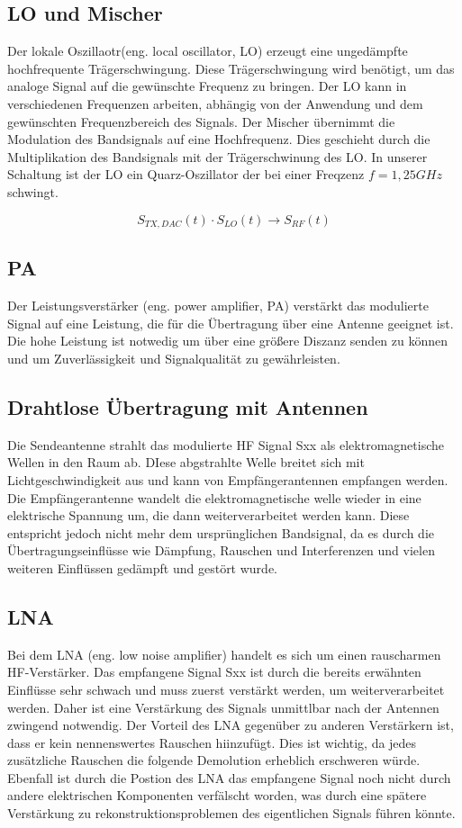 \subsection{LO und Mischer}
Der lokale Oszillaotr(eng. local oscillator, LO) erzeugt eine ungedämpfte hochfrequente Trägerschwingung. Diese Trägerschwingung 
wird benötigt, um das analoge Signal auf die gewünschte Frequenz zu bringen. Der LO kann in verschiedenen Frequenzen arbeiten,
abhängig von der Anwendung und dem gewünschten Frequenzbereich des Signals. Der Mischer übernimmt die Modulation des
Bandsignals auf eine Hochfrequenz. Dies geschieht durch die Multiplikation des Bandsignals mit der Trägerschwinung des LO.
In unserer Schaltung ist der LO ein Quarz-Oszillator der bei einer Freqzenz $f=1,25GHz$ schwingt.

\begin{equation}
    S_{TX,DAC}(t) \cdot S_{LO}(t) \rightarrow S_{RF}(t)
\end{equation}


\subsection{PA}
Der Leistungsverstärker (eng. power amplifier, PA) verstärkt das modulierte Signal auf eine Leistung, die für die Übertragung über eine Antenne 
geeignet ist. Die hohe Leistung ist notwedig um über eine größere Diszanz senden zu können und um Zuverlässigkeit und
Signalqualität zu gewährleisten. 

\subsection{Drahtlose Übertragung mit Antennen}
Die Sendeantenne strahlt das modulierte HF Signal Sxx als elektromagnetische Wellen in den Raum ab. DIese abgstrahlte Welle
breitet sich mit Lichtgeschwindigkeit aus und kann von Empfängerantennen empfangen werden. Die Empfängerantenne wandelt
die elektromagnetische welle wieder in eine elektrische Spannung um, die dann weiterverarbeitet werden kann. Diese entspricht
jedoch nicht mehr dem ursprünglichen Bandsignal, da es durch die Übertragungseinflüsse wie Dämpfung, Rauschen und Interferenzen
und vielen weiteren Einflüssen gedämpft und gestört wurde.

\subsection{LNA}
Bei dem LNA (eng. low noise amplifier) handelt es sich um einen rauscharmen HF-Verstärker. Das empfangene Signal Sxx ist
durch die bereits erwähnten Einflüsse sehr schwach und muss  zuerst verstärkt werden, um weiterverarbeitet werden. Daher
ist eine Verstärkung des Signals unmittlbar nach der Antennen zwingend notwendig. Der Vorteil des LNA gegenüber zu
anderen Verstärkern ist, dass er kein nennenswertes Rauschen hiinzufügt. Dies ist wichtig, da jedes zusätzliche Rauschen
die folgende Demolution erheblich erschweren würde. Ebenfall ist durch die Postion des LNA das empfangene Signal noch 
nicht durch andere elektrischen Komponenten verfälscht worden, was durch eine spätere Verstärkung zu rekonstruktionsproblemen
des eigentlichen Signals führen könnte.
